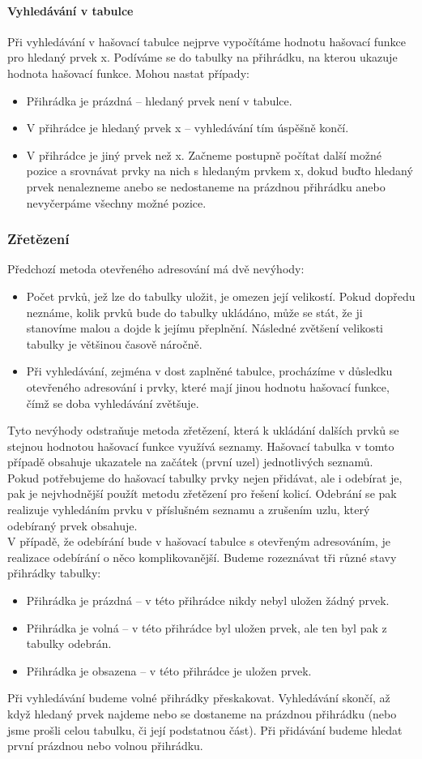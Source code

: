 \documentclass[10pt,a4paper]{article}
\begin{document}
\paragraph{Vyhledávání v tabulce}
Při vyhledávání v hašovací tabulce nejprve vypočítáme hodnotu hašovací funkce pro hledaný prvek x. Podíváme se do tabulky na přihrádku, na kterou ukazuje hodnota hašovací funkce. Mohou nastat případy:
\begin{itemize}
	\item Přihrádka je prázdná – hledaný prvek není v tabulce.
	\item V přihrádce je hledaný prvek x – vyhledávání tím úspěšně končí.
	\item V přihrádce je jiný prvek než x. Začneme postupně počítat další možné pozice a srovnávat prvky na nich s hledaným prvkem x, dokud buďto hledaný prvek nenalezneme anebo se nedostaneme na prázdnou přihrádku anebo nevyčerpáme všechny možné pozice.
\end{itemize}
\subsubsection{Zřetězení}
Předchozí metoda otevřeného adresování má dvě nevýhody:
\begin{itemize}
	\item Počet prvků, jež lze do tabulky uložit, je omezen její velikostí. Pokud dopředu neznáme, kolik prvků bude do tabulky ukládáno, může se stát, že ji stanovíme malou a dojde k jejímu přeplnění. Následné zvětšení velikosti tabulky je většinou časově náročně.
	\item Při vyhledávání, zejména v dost zaplněné tabulce, procházíme v důsledku otevřeného adresování i prvky, které mají jinou hodnotu hašovací funkce, čímž se doba vyhledávání zvětšuje.
\end{itemize}
Tyto nevýhody odstraňuje metoda zřetězení, která k ukládání dalších prvků se stejnou hodnotou hašovací funkce využívá seznamy. Hašovací tabulka v tomto případě obsahuje ukazatele na začátek (první uzel) jednotlivých seznamů. \\
Pokud potřebujeme do hašovací tabulky prvky nejen přidávat, ale i odebírat je, pak je nejvhodnější použít metodu zřetězení pro řešení kolicí. Odebrání se pak realizuje vyhledáním prvku v příslušném seznamu a zrušením uzlu, který odebíraný prvek obsahuje.\\
V případě, že odebírání bude v hašovací tabulce s otevřeným adresováním, je realizace odebírání o něco komplikovanější. Budeme rozeznávat tři různé stavy přihrádky tabulky:
\begin{itemize}
	\item Přihrádka je prázdná – v této přihrádce nikdy nebyl uložen žádný prvek.
	\item Přihrádka je volná – v této přihrádce byl uložen prvek, ale ten byl pak z tabulky odebrán.
	\item Přihrádka je obsazena – v této přihrádce je uložen prvek.
\end{itemize}
Při vyhledávání budeme volné přihrádky přeskakovat. Vyhledávání skončí, až když hledaný prvek najdeme nebo se dostaneme na prázdnou přihrádku (nebo jsme prošli celou tabulku, či její podstatnou část). Při přidávání budeme hledat první prázdnou nebo volnou přihrádku.
\end{document}
